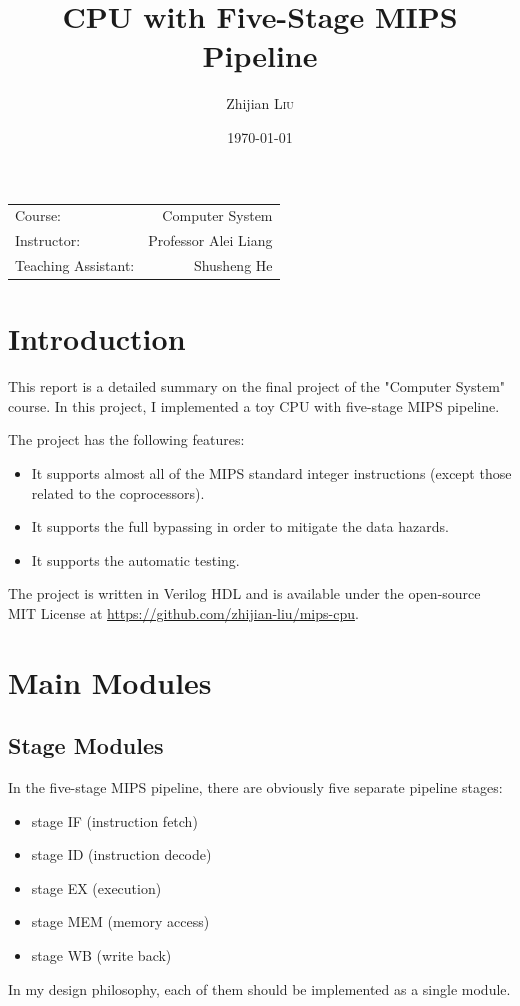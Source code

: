 \documentclass{article}
\title{CPU with Five-Stage MIPS Pipeline}
\author{Zhijian \textsc{Liu}}
\date{\today}
\begin{document}
\maketitle

\begin{center}
\begin{tabular}{l r}
Course: & Computer System\\
Instructor: & Professor Alei Liang\\
Teaching Assistant: & Shusheng He
\end{tabular}
\end{center}

\tableofcontents
\newpage

\section{Introduction}
This report is a detailed summary on the final project of the "Computer System" course. In this project, I implemented a toy CPU with five-stage MIPS pipeline.

The project has the following features:
\begin{itemize}
\item
It supports almost all of the MIPS standard integer instructions (except those related to the coprocessors).
\item
It supports the full bypassing in order to mitigate the data hazards.
\item
It supports the automatic testing.
\end{itemize}
The project is written in Verilog HDL and is available under the open-source MIT License at \url{https://github.com/zhijian-liu/mips-cpu}.

\section{Main Modules}

\subsection{Stage Modules}
In the five-stage MIPS pipeline, there are obviously five separate pipeline stages:
\begin{itemize}
\item
stage IF (instruction fetch)
\item
stage ID (instruction decode)
\item
stage EX (execution)
\item
stage MEM (memory access)
\item
stage WB (write back)
\end{itemize}
In my design philosophy, each of them should be implemented as a single module.
\end{document}
